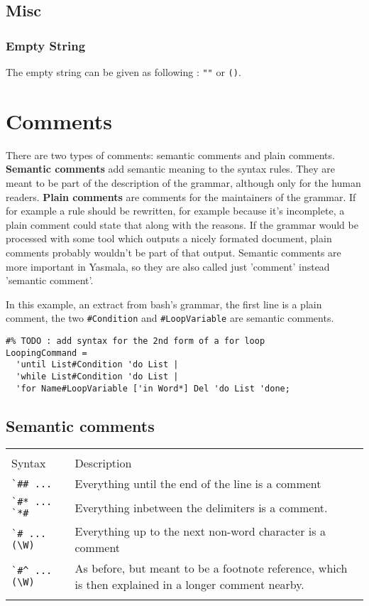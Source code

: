 \documentclass[a4paper]{report}
\begin{document}
\section{Misc}

\subsection{Empty String}

The empty string can be given as following : \verb|""| or \verb|()|. 

\chapter{Comments}

There are two types of comments: semantic comments and plain comments.
\textbf{Semantic comments} add semantic meaning to the syntax rules. They are
meant to be part of the description of the grammar, although only for the human
readers. \textbf{Plain comments} are comments for the maintainers of the
grammar. If for example a rule should be rewritten, for example because it's
incomplete, a plain comment could state that along with the reasons. If the
grammar would be processed with some tool which outputs a nicely formated
document, plain comments probably wouldn't be part of that output. Semantic
comments are more important in Yasmala, so they are also called just 'comment'
instead 'semantic comment'.

In this example, an extract from bash's grammar, the first line is a plain
comment, the two \verb|#Condition| and \verb|#LoopVariable| are semantic
comments.

\begin{verbatim}
#% TODO : add syntax for the 2nd form of a for loop
LoopingCommand =
  'until List#Condition 'do List |
  'while List#Condition 'do List |
  'for Name#LoopVariable ['in Word*] Del 'do List 'done;
\end{verbatim}  

\section{Semantic comments}

\begin{tabular}{p{2cm}p{9.5cm}}
  & \\
Syntax              & Description \\  
\verb|`## ...|      & Everything until the end of the line is a comment \\
\verb|`#* ... `*#|  & Everything inbetween the delimiters is a comment. \\
\verb|`# ... (\W)|  & Everything up to the next non-word character is a comment \\
\verb|`#^ ... (\W)| & As before, but meant to be a footnote reference, which is then explained in a longer comment nearby.\\
 & \\
\end{tabular}
\end{document}
